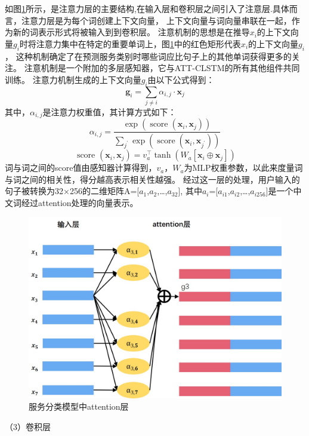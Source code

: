   如图\ref{fig:att-cnn}所示，是注意力层的主要结构,在输入层和卷积层之间引入了注意层.具体而言，注意力层是为每个词创建上下文向量，
  上下文向量与词向量串联在一起，作为新的词表示形式将被输入到到卷积层。 
  注意机制的思想是在推导$x_{i}$的上下文向量$g_{i}$时将注意力集中在特定的重要单词上，图\ref{fig:att-cnn}中的红色矩形代表$x_{i}$的上下文向量$g_{i}$，
  这种机制确定了在预测服务类别时哪些词应比句子上的其他单词获得更多的关注。
  注意机制是一个附加的多层感知器，它与ATT-CLSTM的所有其他组件共同训练。
  注意力机制生成的上下文向量$g_{i}$由以下公式得到：
  \begin{equation}
  \mathbf{g}_{i}=\sum_{j \neq i} \alpha_{i, j} \cdot \mathbf{x}_{j}
\end{equation}
其中，$\alpha_{i, j}$是注意力权重值，其计算方式如下：
\begin{equation}
\alpha_{i, j}=\frac{\exp \left(\operatorname{score}\left(\mathbf{x}_{i}, \mathbf{x}_{j}\right)\right)}{\sum_{j^{\prime}} \exp \left(\operatorname{score}\left(\mathbf{x}_{i}, \mathbf{x}_{j^{\prime}}\right)\right)}
\end{equation}
\begin{equation}
\text { score }\left(\mathbf{x}_{i}, \mathbf{x}_{j}\right)=v_{a}^{\top} \tanh \left(W_{a}\left[\mathbf{x}_{i} \oplus \mathbf{x}_{j}\right]\right)
\end{equation}
词与词之间的score值由感知器计算得到，$v_{a}，W_{a}$为MLP权重参数，以此来度量词与词之间的相关性，得分越高表示相关性越强。
经过这一层的处理，用户输入的句子被转换为32×256的二维矩阵A=[$a_{1}$,$a_{2}$,\dots,$a_{32}$],
其中$a_{i}$=[$a_{i1}$,$a_{i2}$,\dots,$a_{i256}$]是一个中文词经过attention处理的向量表示。

\begin{figure}[htbp]
  \centering
  \includegraphics[scale=0.4]{./images/attcnn.jpg}
  \caption{服务分类模型中attention层}
  \label{fig:att-cnn}
\end{figure}
  （3）卷积层

